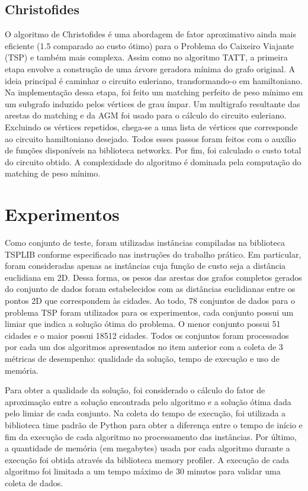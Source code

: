 \documentclass[12pt]{article}
\begin{document}
\subsection{Christofides}

O algoritmo de Christofides é uma abordagem de fator aproximativo ainda mais eficiente (1.5 comparado ao custo ótimo) para o Problema do Caixeiro Viajante (TSP) e também mais complexa. Assim como no algoritmo TATT, a primeira etapa envolve a construção de uma árvore geradora mínima do grafo original. A ideia principal é caminhar o circuito euleriano, transformando-o em hamiltoniano. Na implementação dessa etapa, foi feito um matching perfeito de peso mínimo em um subgrafo induzido pelos vértices de grau ímpar. Um multigrafo resultante das arestas do matching e da AGM foi usado para o cálculo do circuito euleriano. Excluindo os vértices repetidos, chega-se a uma lista de vértices que corresponde ao circuito hamiltoniano desejado. Todos esses passos foram feitos com o auxílio de funções disponíveis na biblioteca networkx. Por fim, foi calculado o custo total do circuito obtido. A complexidade do algoritmo é dominada pela computação do matching de peso mínimo.

\section{Experimentos}

Como conjunto de teste, foram utilizadas instâncias compiladas na biblioteca TSPLIB conforme especificado nas instruções do trabalho prático. Em particular, foram consideradas apenas as instâncias cuja função de custo seja a distância euclidiana em 2D. Dessa forma, os pesos das arestas dos grafos completos gerados do conjunto de dados foram estabelecidos com as distâncias euclidianas entre os pontos 2D que correspondem às cidades. Ao todo, 78 conjuntos de dados para o problema TSP foram utilizados para os experimentos, cada conjunto possui um limiar que indica a solução ótima do problema. O menor conjunto possui 51 cidades e o maior possui 18512 cidades. Todos os conjuntos foram processados por cada um dos algoritmos apresentados no item anterior com a coleta de 3 métricas de desempenho: qualidade da solução, tempo de execução e uso de memória. 

Para obter a qualidade da solução, foi considerado o cálculo do fator de aproximação entre a solução encontrada pelo algoritmo e a solução ótima dada pelo limiar de cada conjunto. Na coleta do tempo de execução, foi utilizada a biblioteca time padrão de Python para obter a diferença entre o tempo de início e fim da execução de cada algoritmo no processamento das instâncias. Por último, a quantidade de memória (em megabytes) usada por cada algoritmo durante a execução foi obtida através da biblioteca memory profiler. A execução de cada algoritmo foi limitada a um tempo máximo de 30 minutos para validar uma coleta de dados.
\end{document}
